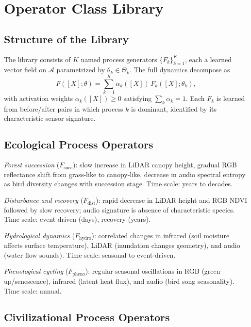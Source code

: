 \documentclass[11pt, oneside]{article}
\begin{document}
\section{Operator Class Library}
\label{app:operators}

\subsection{Structure of the Library}

The library consists of $K$ named process generators $\{F_k\}_{k=1}^K$, each a learned
vector field on $\mathcal{A}$ parametrized by $\theta_k \in \Theta_k$. The full dynamics
decompose as
\[
F([X];\theta) = \sum_{k=1}^K \alpha_k([X])\, F_k([X];\theta_k),
\]
with activation weights $\alpha_k([X]) \ge 0$ satisfying $\sum_k \alpha_k = 1$. Each
$F_k$ is learned from before/after pairs in which process $k$ is dominant, identified by
its characteristic sensor signature.

\subsection{Ecological Process Operators}

\emph{Forest succession} ($F_{\mathrm{succ}}$): slow increase in LiDAR canopy height,
gradual RGB reflectance shift from grass-like to canopy-like, decrease in audio spectral
entropy as bird diversity changes with succession stage. Time scale: years to decades.

\emph{Disturbance and recovery} ($F_{\mathrm{dist}}$): rapid decrease in LiDAR height
and RGB NDVI followed by slow recovery; audio signature is absence of characteristic
species. Time scale: event-driven (days), recovery (years).

\emph{Hydrological dynamics} ($F_{\mathrm{hydro}}$): correlated changes in infrared
(soil moisture affects surface temperature), LiDAR (inundation changes geometry), and
audio (water flow sounds). Time scale: seasonal to event-driven.

\emph{Phenological cycling} ($F_{\mathrm{pheno}}$): regular seasonal oscillations in RGB
(green-up/senescence), infrared (latent heat flux), and audio (bird song seasonality).
Time scale: annual.

\subsection{Civilizational Process Operators}
\end{document}
